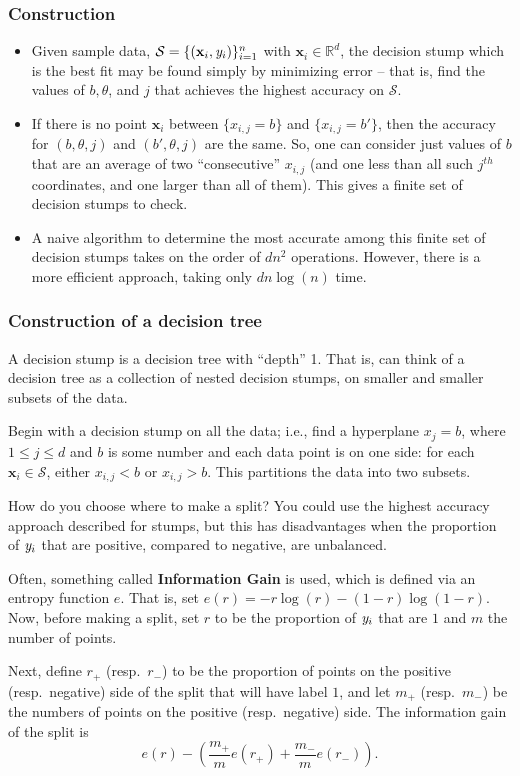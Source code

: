 \documentclass[smaller]{beamer}
\theoremstyle{example}
\newcommand{\x}{\textbf{x}}
\newcommand{\ix}[1]{{\it #1}}
\begin{document}
\begin{frame}
    \frametitle{Construction}
    \begin{itemize}
        \item Given sample data, $\mathcal S = \{(\x_i, \ix y_i)\}_{i=1}^n$ with $\x_i\in\mathbb R^d$, the decision stump which is the best fit may be found simply by minimizing error {--} that is, find the values of $b, \theta$, and $j$ that achieves the highest accuracy on $\mathcal S$. 
        \item If there is no point $\x_i$ between $\{x_{i,j} = b\}$ and $\{x_{i,j} = b'\}$, then the accuracy for $(b,\theta,j)$ and $(b',\theta,j)$ are the same. So, one can consider just values of $b$ that are an average of two ``consecutive'' $x_{i,j}$ (and one less than all such $j^{th}$ coordinates, and one larger than all of them). This gives a finite set of decision stumps to check.
        \item A naive algorithm to determine the most accurate among this finite set of decision stumps takes on the order of $dn^2$ operations. \newline 
        However, there is a more efficient approach, taking only $dn\log(n)$ time.
    \end{itemize}
\end{frame}

\begin{frame}
    \frametitle{Construction of a decision tree}
A decision stump is a decision tree with ``depth'' 1. That is, can think of a decision tree as a collection of nested decision stumps, on smaller and smaller subsets of the data.

Begin with a decision stump on all the data; i.e., find a hyperplane $ x_j = b$, where $ 1\le j\le d$ and $b$ is some number and each data point is on one side: for each $\x_i \in \mathcal S$, either $x_{i,j} < b$ or $ x_{i,j} > b$. This partitions the data into two subsets.

How do you choose where to make a split? You could use the highest accuracy approach described for stumps, but this has disadvantages when the proportion of $\ix y_i$ that are positive, compared to negative, are unbalanced.

Often, something called \textbf{Information Gain} is used, which is defined via an entropy function $e$. That is, set $e(r) = -r\log(r) - (1-r)\log(1-r)$. Now, before making a split, set $r$ to be the proportion of $\ix y_i$ that are $1$ and $m$ the number of points. 

Next, define $r_+$ (resp.\ $r_-$) to be the proportion of points on the positive (resp.\ negative) side of the split that will have label $1$, and let $m_+$ (resp.\ $m_-$) be the numbers of points on the positive (resp.\ negative) side. The information gain of the split is 
    \[e(r) - (\frac{m_+}{m}e(r_+) + \frac{m_-}{m}e(r_-)).\]

\end{frame}
\end{document}
